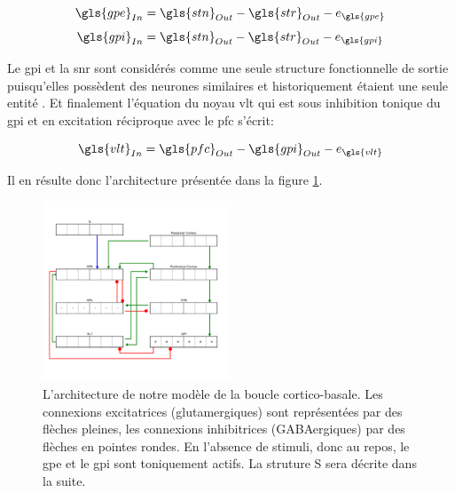 \begin{center}
\begin{equation} 
{\gls{gpe}}_{In}= {\gls{stn}}_{Out}-{\gls{str}}_{Out}-e_{\gls{gpe}}
 \end{equation}
\begin{equation} 
{\gls{gpi}}_{In}= {\gls{stn}}_{Out}-{\gls{str}}_{Out}-e_{\gls{gpi}}
 \end{equation}
\end{center}

Le \gls{gpi} et la \gls{snr} sont considérés comme une seule structure fonctionnelle de sortie puisqu'elles possèdent des neurones similaires et historiquement étaient une seule entité \cite{Carpenter:1981}. Et finalement l'équation du noyau \gls{vlt} qui est sous inhibition tonique du \gls{gpi} et en excitation réciproque avec le \gls{pfc} s'écrit:

\begin{center}
\begin{equation} 
{\gls{vlt}}_{In}= {\gls{pfc}}_{Out}-{\gls{gpi}}_{Out}-e_{\gls{vlt}}
 \end{equation}
\end{center}

Il en résulte donc l'architecture présentée dans la figure \ref{TBG0}.

\begin{figure}
\begin{center}
\includegraphics[width=0.5\textwidth]{figures/ch4_7_TBG_00}
\end{center}
\caption{L'architecture de notre modèle de la boucle cortico-basale. Les connexions excitatrices (glutamergiques) sont représentées par des flèches pleines, les connexions inhibitrices (GABAergiques) par des flèches en pointes rondes. En l'absence de stimuli, donc au repos, le \protect\gls{gpe} et le \protect\gls{gpi} sont toniquement actifs. La struture S sera décrite dans la suite.}
\label{TBG0}
\end{figure} 

